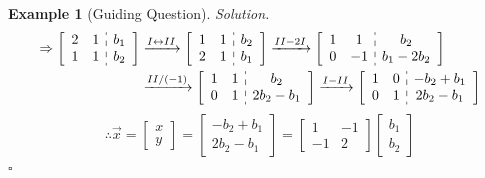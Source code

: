 \documentclass[12pt, a4paper]{article}
\newtheorem{eg}{Example}[subsection]
\newenvironment*{sol}{\indent\textit{Solution. }}{\hfill{$\square$}\par}
\def\vecx{\vec{x}}
\begin{document}
\begin{eg}[Guiding Question]
\begin{sol}
		\[\begin{aligned}\Rightarrow\left[\begin{array}{c:c}\begin{matrix}2&1\\1&1\end{matrix}&\begin{matrix}b_1\\b_2\end{matrix}\end{array}\right]&\xrightarrow[]{I\leftrightarrow II}\left[\begin{array}{c:c}\begin{matrix}1&1\\2&1\end{matrix}&\begin{matrix}b_2\\b_1\end{matrix}\end{array}\right]\xrightarrow[]{II-2I}\left[\begin{array}{c:c}\begin{matrix}1&1\\0&-1\end{matrix}&\begin{matrix}b_2\\b_1-2b_2\end{matrix}\end{array}\right]\\&\xrightarrow[]{II/(-1)}\left[\begin{array}{c:c}\begin{matrix}1&1\\0&1\end{matrix}&\begin{matrix}b_2\\2b_2-b_1\end{matrix}\end{array}\right]\xrightarrow[]{I-II}\left[\begin{array}{c:c}\begin{matrix}1&0\\0&1\end{matrix}&\begin{matrix}-b_2+b_1\\2b_2-b_1\end{matrix}\end{array}\right]\end{aligned}\]
		\[\therefore\vecx=\begin{bmatrix}x\\y\end{bmatrix}=\begin{bmatrix}-b_2+b_1\\2b_2-b_1\end{bmatrix}=\begin{bmatrix}1&-1\\-1&2\end{bmatrix}\begin{bmatrix}b_1\\b_2\end{bmatrix}\]
	\end{sol}
\end{eg}
\end{document}
